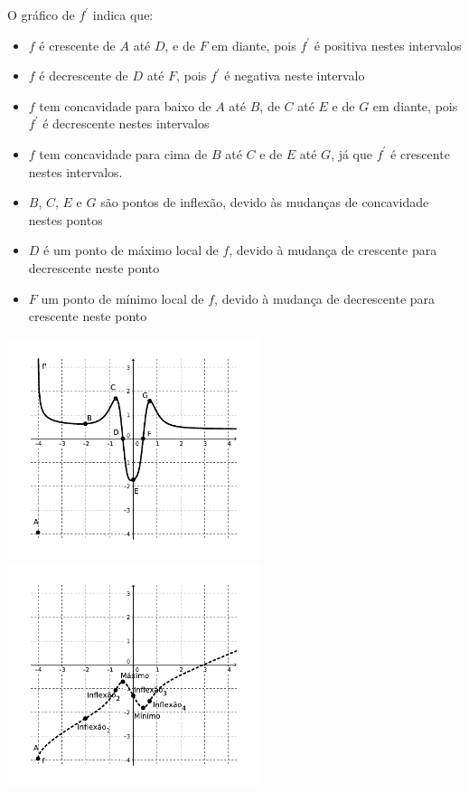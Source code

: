 \documentclass[12pt,a4paper]{article}
\begin{document}
\begin{enumerate}
\begin{minipage}[]{0.57\linewidth}
O gráfico de $f^\prime$ indica que:
\begin{itemize}
\item $f$ é crescente de $A$ até $D$, e de $F$ em diante, pois $f^\prime$ é positiva nestes intervalos
\item $f$ é decrescente de $D$ até $F$, pois $f^\prime$ é negativa neste intervalo
\item $f$ tem concavidade para baixo de $A$ até $B$, de $C$ até $E$ e de $G$ em diante, pois $f^\prime$ é decrescente nestes intervalos
\item $f$ tem concavidade para cima de $B$ até $C$ e de $E$ até $G$, já que $f^\prime$ é crescente nestes intervalos.
\item $B$, $C$, $E$ e $G$ são pontos de inflexão, devido às mudanças de concavidade nestes pontos
\item $D$ é um ponto de máximo local de $f$, devido à mudança de crescente para decrescente neste ponto
\item $F$ um ponto de mínimo local de $f$, devido à mudança de decrescente para crescente neste ponto
\end{itemize}
\end{minipage}
\begin{minipage}[]{0.42\linewidth}
\includegraphics[width=7.4cm]{img/prova-3-ele-grafico-f'}
\includegraphics[width=7.4cm]{img/prova-3-ele-grafico-f}
\end{minipage}
\end{enumerate}
\end{document}

